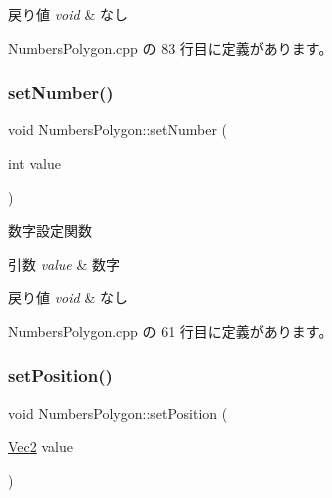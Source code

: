 \begin{DoxyRetVals}{戻り値}
{\em void} & なし \\
\hline
\end{DoxyRetVals}


 Numbers\+Polygon.\+cpp の 83 行目に定義があります。

\mbox{\label{class_numbers_polygon_a63795f3d07dd587d494d36a4973426c4}} 
\subsubsection{\texorpdfstring{set\+Number()}{setNumber()}}
{\footnotesize\ttfamily void Numbers\+Polygon\+::set\+Number (\begin{DoxyParamCaption}\item[{int}]{value }\end{DoxyParamCaption})}



数字設定関数 


\begin{DoxyParams}{引数}
{\em value} & 数字 \\
\hline
\end{DoxyParams}

\begin{DoxyRetVals}{戻り値}
{\em void} & なし \\
\hline
\end{DoxyRetVals}


 Numbers\+Polygon.\+cpp の 61 行目に定義があります。

\mbox{\label{class_numbers_polygon_ad7f5669e7970fa7b0f611d7448cdd5e5}} 
\subsubsection{\texorpdfstring{set\+Position()}{setPosition()}}
{\footnotesize\ttfamily void Numbers\+Polygon\+::set\+Position (\begin{DoxyParamCaption}\item[{\mbox{\hyperlink{_vector3_d_8h_a5ef6e95dfc5f9d3820b71772d99bbc25}{Vec2}}}]{value }\end{DoxyParamCaption})}



